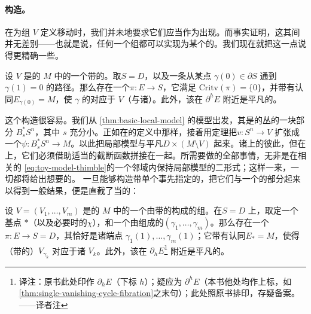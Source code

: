 \paragraph{构造\trLefschetzFibration{}。}\label{sub:constructing-lefschetz-fibrations}
在为组 $V$ 定义\trHurwitz{}移动时，我们并未\trApriori{}地要求它们应当作为\trVanishingCycle{}出现。而事实证明，这其间并无差别——也就是说，任何一个组都可以实现为某个\trFibration{}的\trDistinguishedBasis。我们现在就把这一点说得更精确一些。
\begin{lemma}\label{thm:single-vanishing-cycle-fibration}
设 $V$ 是\trCorneredBoundary{}的\trExactSymplectic\trManifold{} $M$ 中的一个带\trFrame{}的\trExact\trLagrange\trSphere。取\trDisk{}$S=D$，以及一条从某点 $\gamma(0)\in\partial S$ 通到 $\gamma(1)=0$ 的\trEmbedding{}路径。那么存在一个\trExact\trLefschetzFibration{}$\pi\colon E\to S$，它满足 $\mathrm{Critv}(\pi)=\{0\}$，并带有认同$E_{\gamma(0)}=M$，使 $\gamma$ 的\trVanishingCycle{}对应于 $V$（与诸\trFrame{}\trCompatible{}）。此外，该\trFibration{}在 $\partial^hE$ 附近是平凡的。
\end{lemma}
这个构造很容易。我们从 \cref{thm:basic-local-model} 的模型出发，其\trFiber{}是\trSphere{}的\trCotangent{}丛的一块\trCompact{}部分 $B_s^*S^n$，其中 $s$ 充分小。正如在\trDehnTwist{}的定义中那样，接着用\trLagrange\trTubularNeighborhood{}定理把\trFrame{}$v\colon S^n\to V$ 扩张成一个\trEmbedding{}$\psi\colon B_s^*S^n\to M$。以此把局部模型与平凡\trFibration{}$D\times(M\setminus V)$ \trGluing{}起来。诸\trFiber{}上的\trSymplecticForm{}彼此\trConsistent{}，但在\trTotalSpace{}上，它们必须借助适当的截断函数拼接在一起。所需要做的全部事情，无非是在相关的\trLefschetzThimble{} \eqref{eq:toy-model-thimble}的一个邻域内保持局部模型的二形式；这样一来，一切\trVanishingPath{}都将给出想要的\trLagrange\trSphere。
一旦能够构造带单个事先指定\trVanishingCycle{}的\trLefschetzFibration{}，把它们与一个\trNonsingular{}的部分\trGluing{}起来以得到一般结果，便是直截了当的：
\begin{lemma}\label{thm:realizing-distinguished-basis}
设 $V=(V_1,\ldots,V_m)$ 是\trCorneredBoundary{}的\trExactSymplectic\trManifold{} $M$ 中的一个由带\trFrame{}的\trExact\trLagrange\trSphere{}构成的组。在\trDisk{}$S=D$ 上，取定一个基点 $*$（以及必要时的\trBasePath{}$\chi$），和一个由\trVanishingPath{}组成的\trDistinguishedBasis{}$(\gamma_1,\ldots,\gamma_m)$。那么存在一个\trExact\trLefschetzFibration{}$\pi\colon E\to S=D$，其\trCriticalValue{}恰好是诸端点 $\gamma_1(1),\ldots,\gamma_m(1)$；它带有认同$E_*=M$，使得（带\trFrame{}的）\trVanishingCycle{}$V_{\gamma_k}$ 对应于诸 $V_k$。此外，该\trFibration{}在 $\partial_hE$\footnote{译注：原书此处印作 $\partial_hE$（下标 $h$）；疑应为 $\partial^hE$（本书他处均作上标，如\cref{thm:single-vanishing-cycle-fibration}之末句）；此处照原书排印，存疑备案。——译者注} 附近是平凡的。
\end{lemma}
